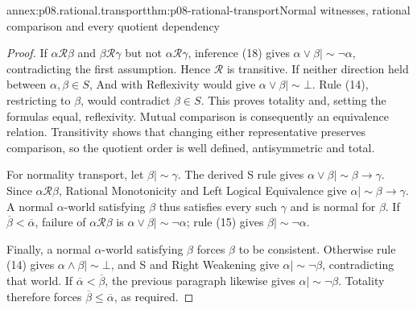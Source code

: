 \begin{annexitem}{annex:p08.rational.transport}{thm:p08-rational-transport}{Normal witnesses, rational comparison and every quotient dependency}
\begin{proof}
If \(\alpha\mathcal R\beta\) and \(\beta\mathcal R\gamma\)
but not \(\alpha\mathcal R\gamma\), inference (18) gives
\(\alpha\vee\beta\mathrel{|\!\sim}\neg\alpha\),
contradicting the first assumption. Hence \(\mathcal R\) is
transitive. If neither direction held between \(\alpha,\beta\in S\),
And with Reflexivity would give
\(\alpha\vee\beta\mathrel{|\!\sim}\bot\).
Rule (14), restricting to \(\beta\), would contradict \(\beta\in S\).
This proves totality and, setting the formulas equal, reflexivity.
Mutual comparison is consequently an equivalence relation. Transitivity
shows that changing either representative preserves comparison, so
the quotient order is well defined, antisymmetric and total.

For normality transport, let \(\beta\mathrel{|\!\sim}\gamma\).
The derived S rule gives
\(\alpha\vee\beta\mathrel{|\!\sim}\beta\to\gamma\).
Since \(\alpha\mathcal R\beta\), Rational Monotonicity and
Left Logical Equivalence give
\(\alpha\mathrel{|\!\sim}\beta\to\gamma\).
A normal \(\alpha\)-world satisfying \(\beta\) thus satisfies
every such \(\gamma\) and is normal for \(\beta\).
If \(\overline\beta<\overline\alpha\), failure of
\(\alpha\mathcal R\beta\) is
\(\alpha\vee\beta\mathrel{|\!\sim}\neg\alpha\);
rule (15) gives \(\beta\mathrel{|\!\sim}\neg\alpha\).

Finally, a normal \(\alpha\)-world satisfying \(\beta\)
forces \(\beta\) to be consistent. Otherwise rule (14) gives
\(\alpha\wedge\beta\mathrel{|\!\sim}\bot\), and S and
Right Weakening give \(\alpha\mathrel{|\!\sim}\neg\beta\),
contradicting that world. If
\(\overline\alpha<\overline\beta\), the previous paragraph
likewise gives \(\alpha\mathrel{|\!\sim}\neg\beta\).
Totality therefore forces
\(\overline\beta\leq\overline\alpha\), as required.
\end{proof}
\end{annexitem}

